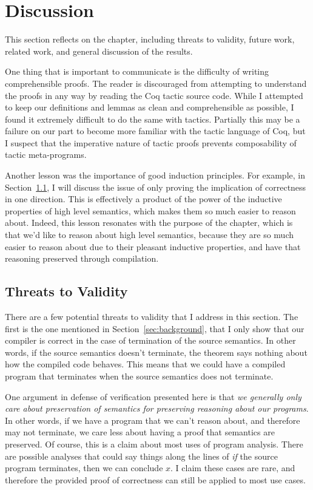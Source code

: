 \section{Discussion} \label{sec:discussion}

This section reflects on the chapter, including threats to validity, future
work, related work, and general discussion of the results.

One thing that is important to communicate is the difficulty of writing
comprehensible proofs. The reader is discouraged from attempting to understand
the proofs in any way by reading the Coq tactic source code. While I attempted
to keep our definitions and lemmas as clean and comprehensible as possible, I
found it extremely difficult to do the same with tactics. Partially this may be
a failure on our part to become more familiar with the tactic language of Coq,
but I suspect that the imperative nature of tactic proofs prevents composability
of tactic meta-programs. 

Another lesson was the importance of good induction principles. For example, in
Section~\ref{sec:threats}, I will discuss the issue of only proving the
implication of correctness in one direction. This is effectively a product of
the power of the inductive properties of high level semantics, which makes them
so much easier to reason about. Indeed, this lesson resonates with the purpose
of the chapter, which is that we'd like to reason about high level semantics,
because they are so much easier to reason about due to their pleasant inductive
properties, and have that reasoning preserved through compilation. 

\subsection{Threats to Validity} \label{sec:threats}

There are a few potential threats to validity that I address in this section. The
first is the one mentioned in Section~\ref{sec:background}, that I only show
that our compiler is correct in the case of termination of the source semantics.
In other words, if the source semantics doesn't terminate, the theorem says
nothing about how the compiled code behaves. This means that we could have a
compiled program that terminates when the source semantics does not terminate.

One argument in defense of verification presented here is that \emph{we
generally only care about preservation of semantics for preserving reasoning
about our programs}. In other words, if we have a program that we can't reason
about, and therefore may not terminate, we care less about having a proof that
semantics are preserved.  Of course, this is a claim about most uses of program
analysis. There are possible analyses that could say things along the lines of
\emph{if} the source program terminates, then we can conclude $x$. I claim these
cases are rare, and therefore the provided proof of correctness can still be
applied to most use cases.  

